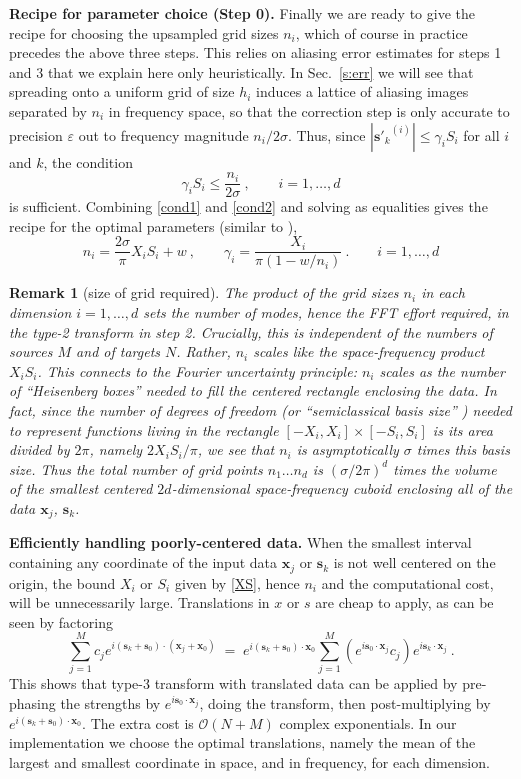 \documentclass[10pt]{article}
\newcommand{\be}{\begin{equation}}
\newcommand{\ee}{\end{equation}}
\newcommand{\mbf}[1]{{\mathbf #1}}
\newcommand{\eps}{\varepsilon}
\newcommand{\bigO}{{\mathcal O}}
\newtheorem{rmk}[thm]{Remark}
\newcommand{\xx}{\mbf{x}}
\newcommand{\sss}{\mbf{s}}
\newcommand{\rat}{\sigma}          %
\begin{document}
{\bf Recipe for parameter choice (Step 0).}
Finally we are ready to give the recipe for choosing the upsampled grid
sizes $n_i$, which of course in practice precedes the above three steps.
This relies on aliasing error estimates \cite{elbel}
for steps 1 and 3 that we explain here only heuristically.
In Sec.~\ref{s:err} we will see that spreading onto a uniform grid
of size $h_i$ induces a lattice of
aliasing images separated by $n_i$ in frequency space,
so that the correction step is only accurate to precision $\eps$ out to
frequency magnitude $n_i/2\rat$.
Thus, since $|{\sss'_k}^{(i)}| \le \gamma_i S_i$ for all $i$ and $k$,
the condition
\be
\gamma_i S_i \le \frac{n_i}{2\rat}
~,\qquad i=1,\dots,d
\label{cond2}
\ee
is sufficient.
Combining \eqref{cond1} and \eqref{cond2} and solving as equalities
gives the recipe for the optimal parameters (similar to \cite[Rmk.~1]{nufft3}),
\be
n_i = \frac{2\rat}{\pi}X_iS_i + w
~,\qquad
\gamma_i = %
\frac{X_i}{\pi(1 - w/n_i)}
~.
\qquad i=1,\dots,d
\label{ng}
\ee
\begin{rmk}[size of grid required]
  The product of the grid sizes $n_i$ in each dimension $i=1,\dots,d$
  sets the number of modes, hence the FFT effort required,
  in the type-2 transform in step 2.
Crucially,  this is independent of the numbers of sources $M$ and of
  targets $N$.
  Rather, $n_i$ scales like the space-frequency product $X_iS_i$.
  This connects to the Fourier uncertainty principle:
  $n_i$ scales as the number of ``Heisenberg boxes''
  needed to fill the centered rectangle enclosing the data.
  In fact, since the number of degrees of freedom \cite[p.~391]{slepianrev}
  (or ``semiclassical basis size'' \cite{davisheller})
  needed to represent functions
  living in the rectangle $[-X_i,X_i]\times[-S_i,S_i]$ is its area divided
  by $2\pi$, namely $2X_iS_i/\pi$, we see that
  $n_i$ is asymptotically $\rat$ times this basis size.
  Thus the total number of grid points $n_1\dots n_d$ is $(\rat/2\pi)^d$
  times the volume of the smallest centered $2d$-dimensional space-frequency
  cuboid enclosing all of the data $\xx_j$, $\sss_k$.
  \label{r:heis}
\end{rmk}

{\bf Efficiently handling poorly-centered data.}
When the smallest interval containing any coordinate of the input data
$\xx_j$ or $\sss_k$
is not well centered on the origin, the bound $X_i$ or $S_i$ given
by \eqref{XS}, hence $n_i$ and the computational cost,
will be unnecessarily large.
Translations in $x$ or $s$ are cheap to apply,
as can be seen by factoring
\be
\sum_{j=1}^M c_j e^{i (\sss_k+\sss_0) \cdot (\xx_j+\xx_0)}
\;= \;
e^{i(\sss_k+\sss_0)\cdot\xx_0} \sum_{j=1}^M (e^{i\sss_0\cdot \xx_j}c_j) e^{i \sss_k\cdot\xx_j}~.
\label{trans}
\ee
This shows that type-3 transform with translated data
can be applied by pre-phasing the strengths by $e^{i\sss_0\cdot \xx_j}$,
doing the transform, then post-multiplying by $e^{i(\sss_k+\sss_0)\cdot\xx_0}$.
The extra cost is $\bigO(N+M)$ complex exponentials.
In our implementation we
choose the optimal translations, namely the mean of the largest and
smallest coordinate in space, and in frequency, for each dimension.
\end{document}
